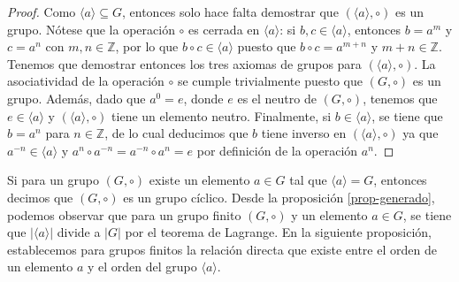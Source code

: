 \begin{proof}
Como $\langle a\rangle\subseteq G$, entonces solo hace falta demostrar
que $(\langle a\rangle,\circ)$ es un grupo. Nótese que la operación
$\circ$ es cerrada en $\langle a\rangle$: si $b,c \in \langle
a\rangle$, entonces $b = a^m$ y $c = a^n$ con $m,n \in \mathbb{Z}$,
por lo que $b \circ c \in \langle a\rangle$ puesto que $b \circ c =
a^{m+n}$ y $m+n \in \mathbb{Z}$. Tenemos que demostrar entonces los
tres axiomas de grupos para $(\langle a\rangle, \circ)$. La
asociatividad de la operación $\circ$ se cumple trivialmente puesto
que $(G,\circ)$ es un grupo. Además, dado que $a^0 = e$, donde $e$ es
el neutro de $(G, \circ)$, tenemos que $e \in \langle a\rangle$ y
$(\langle a\rangle, \circ)$ tiene un elemento neutro. Finalmente, si
$b \in \langle a\rangle$, se tiene que $b = a^n$ para
$n \in \mathbb{Z}$, de lo cual deducimos que $b$ tiene inverso en
$(\langle a\rangle, \circ)$ ya que $a^{-n} \in \langle
a\rangle$ y $a^n \circ a^{-n} = a^{-n} \circ a^n = e$ por definición de la operación $a^n$.
\end{proof}

Si para un grupo $(G, \circ)$ existe un elemento $a \in G$ tal que
$\langle a \rangle = G$, entonces decimos que $(G,\circ)$ es un grupo
cíclico. Desde la proposición \ref{prop-generado}, podemos observar
que para un grupo finito $(G, \circ)$ y un elemento $a \in G$, se
tiene que $|\langle a\rangle |$ divide a $|G|$ por el teorema de
Lagrange. En la siguiente proposición, establecemos para grupos
finitos la relación directa que existe entre el orden de un elemento
$a$ y el orden del grupo $\langle a \rangle$.

